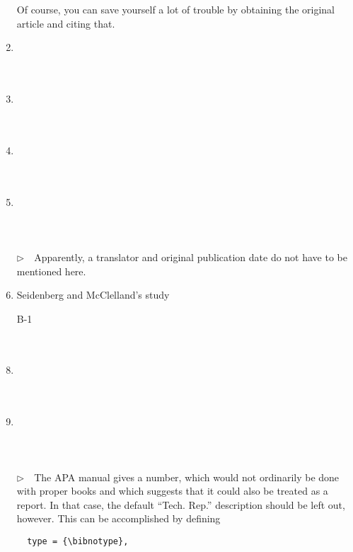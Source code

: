 \documentclass{article}
\newcommand{\EM}{\ensuremath{\triangleright\quad}}
\begin{document}
\begin{enumerate}
      Of course, you can save yourself a lot of trouble by
      obtaining the original article and citing that.
\item \cite{ex18} \\ \cite{ex18}\\ \\ 
\item \cite{ex19} \\ \cite{ex19}\\ \\ 
\item \cite{ex20} \\ \cite{ex20}\\ \\ 
\item \cite{ex21} \\ \cite{ex21}\\ \\ \\
      \EM Apparently, a translator and original publication date
      do not have to be mentioned here.
\item Seidenberg and McClelland's study \cite<as cited in>{ex22}\\
\item[B-1] \cite{B-1}  \\ \cite{B-1} \\  \\ 
\item \cite{ex23} \\ \cite{ex23}\\ \\ 
\item \cite{ex24} \\ \cite{ex24}\\ \\ \\
      \EM The APA manual gives a number, which would not ordinarily be
      done with proper books and which suggests that it could also
      be treated as a report. In that case, the default ``Tech. Rep.''
      description should be left out, however. This can be accomplished
      by defining
\begin{verbatim}
  type = {\bibnotype},

\end{verbatim}
\end{enumerate}
\end{document}

